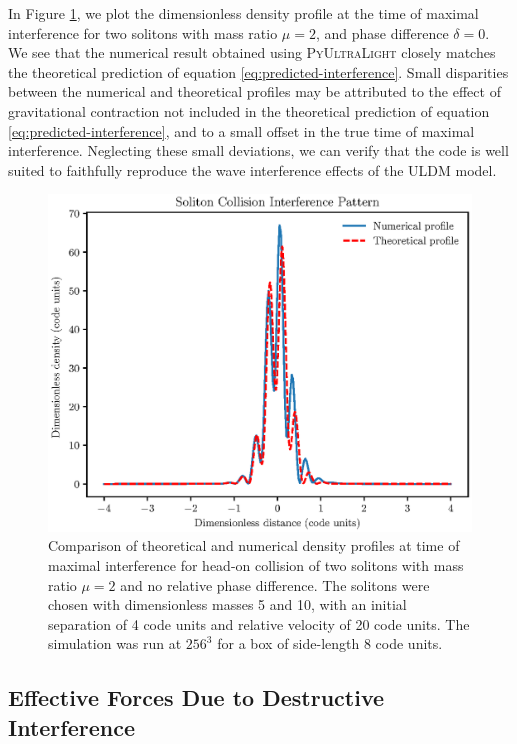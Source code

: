 \documentclass[a4paper,11pt]{article}
\newcommand{\PyUltraLight}{\textsc{PyUltraLight}\xspace}
\begin{document}
In Figure \ref{fig:interference}, we plot the dimensionless density profile at the time of maximal interference for two solitons with mass ratio $\mu=2$, and phase difference $\delta=0$. We see that the numerical result obtained using \PyUltraLight closely matches the theoretical prediction of equation \ref{eq:predicted-interference}. Small disparities between the numerical and theoretical profiles may be attributed to the effect of gravitational contraction not included in the theoretical prediction of equation \ref{eq:predicted-interference}, and to a small offset in the true time of maximal interference. Neglecting these small deviations, we can verify that the code is well suited to faithfully reproduce the wave interference effects of the ULDM model. 
\begin{figure}
  \includegraphics[trim={0 0 0 0.9cm},clip, scale=0.9]{interference_patterns}
  \caption{Comparison of theoretical and numerical density profiles at time of maximal interference for head-on collision of two solitons with mass ratio $\mu=2$ and no relative phase difference. The solitons were chosen with dimensionless masses 5 and 10, with an initial separation of 4 code units and relative velocity of 20 code units. The simulation was run at $256^3$ for a box of side-length 8 code units.}
  \label{fig:interference}
\end{figure}


\subsection{Effective Forces Due to Destructive Interference}
\end{document}
